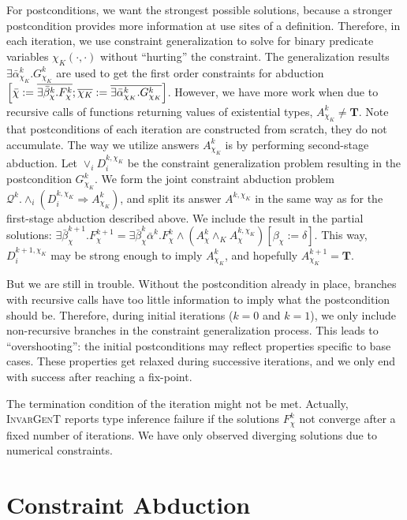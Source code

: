 \documentclass{article}
\newcommand{\assign}{:=}
\newcommand{\cdummy}{\cdot}
\newcommand{\tmmathbf}[1]{\ensuremath{\boldsymbol{#1}}}
\newcommand{\tmname}[1]{\textsc{#1}}
\begin{document}
For postconditions, we want the strongest possible solutions, because a
stronger postcondition provides more information at use sites of a definition.
Therefore, in each iteration, we use constraint generalization to solve for
binary predicate variables $\chi_K (\cdummy, \cdummy)$ without ``hurting'' the
constraint. The generalization results $\exists \bar{\alpha}_{\chi_K}^k
.G_{\chi_K}^k$ are used to get the first order constraints for abduction
$\left[ \bar{\chi} \assign \overline{\exists \bar{\beta}^k_{\chi} .F^k_{\chi}}
; \overline{\chi_K} \assign {\nobreak} \overline{\exists
\bar{\alpha}_{\chi_K}^k .G_{\chi_K}^k} \right]$. However, we have more work
when due to recursive calls of functions returning values of existential
types, $A_{\chi_K}^k \neq \tmmathbf{T}$. Note that postconditions of each
iteration are constructed from scratch, they do not accumulate. The way we
utilize answers $A_{\chi_K}^k$ is by performing second-stage abduction. Let
$\vee_i D_i^{k, \chi_K}$ be the constraint generalization problem resulting in
the postcondition $G_{\chi_K}^k$. We form the joint constraint abduction
problem $\mathcal{Q}^k . \wedge_i (D_i^{k, \chi_K} \Rightarrow A_{\chi_K}^k)$,
and split its answer $A^{k, \chi_K}$ in the same way as for the first-stage
abduction described above. We include the result in the partial solutions:
$\exists \bar{\beta}^{k + 1}_{\chi} .F^{k + 1}_{\chi} = \exists
\bar{\beta}^k_{\chi} \bar{\alpha}^k .F^k_{\chi} \wedge (A^k_{\chi} \wedge_K
A_{\chi}^{k, \chi_K}) [\beta_{\chi} \assign \delta]$. This way, $D_i^{k + 1,
\chi_K}$ may be strong enough to imply $A_{\chi_K}^k$, and hopefully
$A_{\chi_K}^{k + 1} =\tmmathbf{T}$.

But we are still in trouble. Without the postcondition already in place,
branches with recursive calls have too little information to imply what the
postcondition should be. Therefore, during initial iterations ($k = 0$ and $k
= 1$), we only include non-recursive branches in the constraint generalization
process. This leads to ``overshooting'': the initial postconditions may
reflect properties specific to base cases. These properties get relaxed during
successive iterations, and we only end with success after reaching a
fix-point.

The termination condition of the iteration might not be met. Actually,
{\tmname{InvarGenT}} reports type inference failure if the solutions
$F_{\chi}^k$ not converge after a fixed number of iterations. We have only
observed diverging solutions due to numerical constraints.

\section{Constraint Abduction}\label{SecAbduction}\label{AbdAlg}
\end{document}
